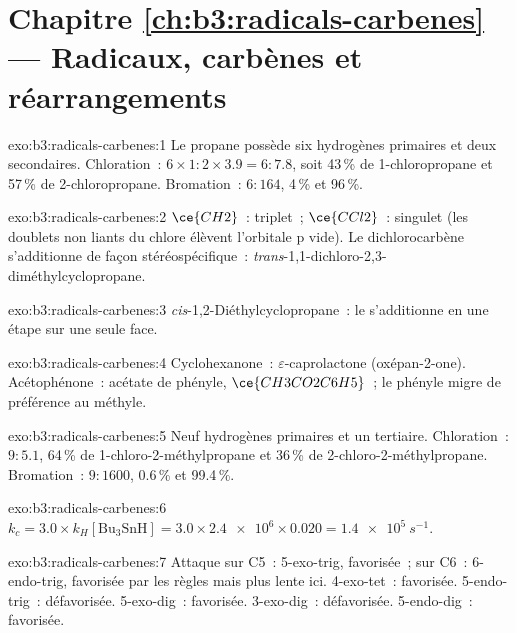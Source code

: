 \section*{Chapitre \ref{ch:b3:radicals-carbenes} --- Radicaux, carbènes et réarrangements}

\begin{solution}{exo:b3:radicals-carbenes:1}
Le propane possède six hydrogènes primaires et deux secondaires. Chloration~: $6 \times 1 : 2 \times 3.9 = 6 : 7.8$,
soit 43\,\% de 1-chloropropane et 57\,\% de 2-chloropropane. Bromation~: $6 : 164$, 4\,\% et
96\,\%.
\end{solution}

\begin{solution}{exo:b3:radicals-carbenes:2}
$\ce{CH2}$~: triplet~; $\ce{CCl2}$~: singulet (les doublets non liants du chlore élèvent l'orbitale p vide).
Le dichlorocarbène s'additionne de façon stéréospécifique~: \textit{trans}-1,1-dichloro-2,3-diméthylcyclopropane.
\end{solution}

\begin{solution}{exo:b3:radicals-carbenes:3}
\textit{cis}-1,2-Diéthylcyclopropane~: le  s'additionne en une étape sur une seule face.
\end{solution}

\begin{solution}{exo:b3:radicals-carbenes:4}
Cyclohexanone~: $\varepsilon$-caprolactone (oxépan-2-one). Acétophénone~: acétate de phényle,
$\ce{CH3CO2C6H5}$~; le phényle migre de préférence au méthyle.
\end{solution}

\begin{solution}{exo:b3:radicals-carbenes:5}
Neuf hydrogènes primaires et un tertiaire. Chloration~: $9 : 5.1$, 64\,\% de 1-chloro-2-méthylpropane
et 36\,\% de 2-chloro-2-méthylpropane. Bromation~: $9 : 1600$, 0.6\,\% et 99.4\,\%.
\end{solution}

\begin{solution}{exo:b3:radicals-carbenes:6}
$k_c = 3.0 \times k_H[\mathrm{Bu_3SnH}] = 3.0 \times \num{2.4e6} \times 0.020 = \qty{1.4e5}{s^{-1}}$.
\end{solution}

\begin{solution}{exo:b3:radicals-carbenes:7}
Attaque sur C5~: 5-exo-trig, favorisée~; sur C6~: 6-endo-trig, favorisée
par les règles mais plus lente ici. 4-exo-tet~: favorisée. 5-endo-trig~:
défavorisée. 5-exo-dig~: favorisée. 3-exo-dig~: défavorisée.
5-endo-dig~: favorisée.
\end{solution}

